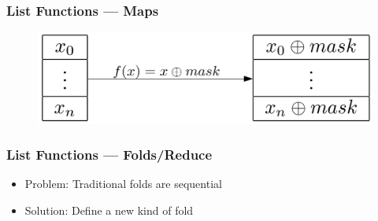 \documentclass{beamer}
\begin{document}
\begin{frame}
    \frametitle{List Functions --- Maps}
    
    
    \begin{figure}
        \includegraphics[keepaspectratio=true,scale=0.2]{src/map.png}
    \end{figure}
\end{frame}


\begin{frame}[t]
    \frametitle{List Functions --- Folds/Reduce}
    \begin{itemize}
        \item Problem:  Traditional folds are sequential
        \item Solution: Define a new kind of fold
    \end{itemize}

    \begin{small}
    \end{small}


\end{frame}
\end{document}
